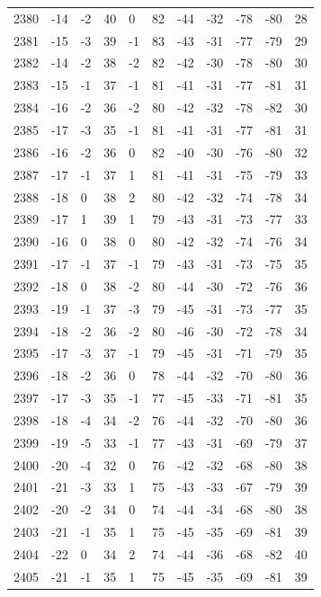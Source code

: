 \begin{table}[H]
\begin{tabular}{lllllllllll}
2380 & -14 & -2 & 40 & 0 & 82 & -44 & -32 & -78 & -80 & 28 \\
2381 & -15 & -3 & 39 & -1 & 83 & -43 & -31 & -77 & -79 & 29 \\
2382 & -14 & -2 & 38 & -2 & 82 & -42 & -30 & -78 & -80 & 30 \\
2383 & -15 & -1 & 37 & -1 & 81 & -41 & -31 & -77 & -81 & 31 \\
2384 & -16 & -2 & 36 & -2 & 80 & -42 & -32 & -78 & -82 & 30 \\
2385 & -17 & -3 & 35 & -1 & 81 & -41 & -31 & -77 & -81 & 31 \\
2386 & -16 & -2 & 36 & 0 & 82 & -40 & -30 & -76 & -80 & 32 \\
2387 & -17 & -1 & 37 & 1 & 81 & -41 & -31 & -75 & -79 & 33 \\
2388 & -18 & 0 & 38 & 2 & 80 & -42 & -32 & -74 & -78 & 34 \\
2389 & -17 & 1 & 39 & 1 & 79 & -43 & -31 & -73 & -77 & 33 \\
2390 & -16 & 0 & 38 & 0 & 80 & -42 & -32 & -74 & -76 & 34 \\
2391 & -17 & -1 & 37 & -1 & 79 & -43 & -31 & -73 & -75 & 35 \\
2392 & -18 & 0 & 38 & -2 & 80 & -44 & -30 & -72 & -76 & 36 \\
2393 & -19 & -1 & 37 & -3 & 79 & -45 & -31 & -73 & -77 & 35 \\
2394 & -18 & -2 & 36 & -2 & 80 & -46 & -30 & -72 & -78 & 34 \\
2395 & -17 & -3 & 37 & -1 & 79 & -45 & -31 & -71 & -79 & 35 \\
2396 & -18 & -2 & 36 & 0 & 78 & -44 & -32 & -70 & -80 & 36 \\
2397 & -17 & -3 & 35 & -1 & 77 & -45 & -33 & -71 & -81 & 35 \\
2398 & -18 & -4 & 34 & -2 & 76 & -44 & -32 & -70 & -80 & 36 \\
2399 & -19 & -5 & 33 & -1 & 77 & -43 & -31 & -69 & -79 & 37 \\
2400 & -20 & -4 & 32 & 0 & 76 & -42 & -32 & -68 & -80 & 38 \\
2401 & -21 & -3 & 33 & 1 & 75 & -43 & -33 & -67 & -79 & 39 \\
2402 & -20 & -2 & 34 & 0 & 74 & -44 & -34 & -68 & -80 & 38 \\
2403 & -21 & -1 & 35 & 1 & 75 & -45 & -35 & -69 & -81 & 39 \\
2404 & -22 & 0 & 34 & 2 & 74 & -44 & -36 & -68 & -82 & 40 \\
2405 & -21 & -1 & 35 & 1 & 75 & -45 & -35 & -69 & -81 & 39 \\

\end{tabular}
\end{table}
